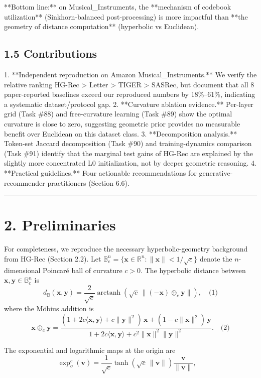 \documentclass[11pt]{article}
\DeclareMathOperator{\arctanh}{arctanh}
\begin{document}
**Bottom line:** on Musical\_Instruments, the **mechanism of codebook utilization** (Sinkhorn-balanced post-processing) is more impactful than **the geometry of distance computation** (hyperbolic vs Euclidean).


\subsection{1.5 Contributions}

1. **Independent reproduction on Amazon Musical\_Instruments.** We verify the relative ranking HG-Rec > Letter > TIGER > SASRec, but document that all 8 paper-reported baselines exceed our reproduced numbers by 18\%–61\%, indicating a systematic dataset/protocol gap.
2. **Curvature ablation evidence.** Per-layer grid (Task \#88) and free-curvature learning (Task \#89) show the optimal curvature is close to zero, suggesting geometric prior provides no measurable benefit over Euclidean on this dataset class.
3. **Decomposition analysis.** Token-set Jaccard decomposition (Task \#90) and training-dynamics comparison (Task \#91) identify that the marginal test gains of HG-Rec are explained by the slightly more concentrated L0 initialization, not by deeper geometric reasoning.
4. **Practical guidelines.** Four actionable recommendations for generative-recommender practitioners (Section 6.6).

\noindent\rule{\textwidth}{0.4pt}


\section{2. Preliminaries}

For completeness, we reproduce the necessary hyperbolic-geometry background from HG-Rec (Section 2.2). Let $\mathbb{B}^n_c = \{\mathbf{x} \in \mathbb{R}^n : \|\mathbf{x}\| < 1/\sqrt{c}\}$ denote the $n$-dimensional Poincaré ball of curvature $c > 0$. The hyperbolic distance between $\mathbf{x}, \mathbf{y} \in \mathbb{B}^n_c$ is
\[d_{\mathbb{B}}(\mathbf{x}, \mathbf{y}) = \frac{2}{\sqrt{c}} \arctanh\!\left(\sqrt{c}\,\|(- \mathbf{x}) \oplus_c \mathbf{y}\|\right),\quad\text{(1)}\]
where the Möbius addition is
\[\mathbf{x} \oplus_c \mathbf{y} = \frac{(1 + 2c\langle \mathbf{x}, \mathbf{y}\rangle + c\|\mathbf{y}\|^2)\,\mathbf{x} + (1 - c\|\mathbf{x}\|^2)\,\mathbf{y}}{1 + 2c\langle \mathbf{x}, \mathbf{y}\rangle + c^2\|\mathbf{x}\|^2 \|\mathbf{y}\|^2}.\quad\text{(2)}\]

The exponential and logarithmic maps at the origin are
$$\exp_o^c(\mathbf{v}) = \frac{1}{\sqrt{c}} \tanh\!\left(\sqrt{c}\,\|\mathbf{v}\|\right) \frac{\mathbf{v}}{\|\mathbf{v}\|}, \quad$$
\end{document}
